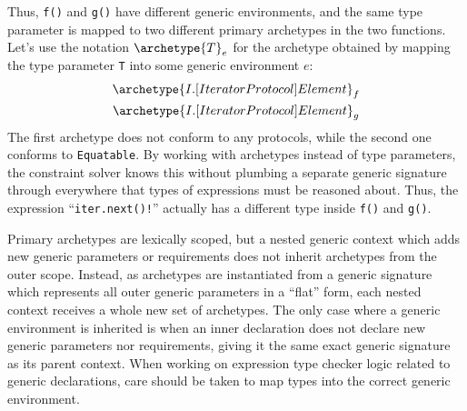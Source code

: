\documentclass[../generics]{subfiles}
\begin{document}
Thus, \texttt{f()} and \texttt{g()} have different generic environments, and the same type parameter is mapped to two different primary archetypes in the two functions. Let's use the notation $\archetype{T}_e$ for the archetype obtained by mapping the type parameter \texttt{T} into some generic environment $e$:
\begin{gather*}
\archetype{I.[IteratorProtocol]Element}_f\\
\archetype{I.[IteratorProtocol]Element}_g
\end{gather*}
The first archetype does not conform to any protocols, while the second one conforms to \texttt{Equatable}. By working with archetypes instead of type parameters, the constraint solver knows this without plumbing a separate generic signature through everywhere that types of expressions must be reasoned about. Thus, the expression ``\texttt{iter.next()!}'' actually has a different type inside \texttt{f()} and \texttt{g()}.

Primary archetypes are lexically scoped, but a nested generic context which adds new generic parameters or requirements does not inherit archetypes from the outer scope. Instead, as archetypes are instantiated from a generic signature which represents all outer generic parameters in a ``flat'' form, each nested context receives a whole new set of archetypes. The only case where a generic environment is inherited is when an inner declaration does not declare new generic parameters nor requirements, giving it the same exact generic signature as its parent context. When working on expression type checker logic related to generic declarations, care should be taken to map types into the correct generic environment.
\end{document}
